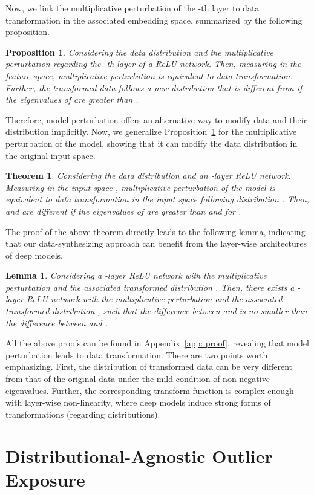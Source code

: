 \documentclass{article} \usepackage{iclr2022_conference,times}
\newtheorem{theorem}{Theorem}
\newtheorem{lemma}{Lemma}
\newtheorem{proposition}{Proposition}
\begin{document}
Now, we link the multiplicative perturbation of the -th layer to data transformation in the associated embedding space, summarized by the following proposition. 
\begin{proposition} \label{prop1}
{Considering the data distribution  and the multiplicative perturbation regarding the -th layer of a ReLU network. Then, measuring in the feature space, multiplicative perturbation is equivalent to data transformation. Further, the transformed data follows a new distribution  that is different from  if the eigenvalues of  are greater than .} 
\end{proposition}
Therefore, model perturbation offers an alternative way to modify data and their distribution implicitly. Now, we generalize Proposition~\ref{prop1} for the multiplicative perturbation of the model, showing that it can modify the data distribution in the original input space. 
\begin{theorem} \label{theo2}
{Considering the data distribution  and an -layer ReLU network. Measuring in the input space , multiplicative perturbation of the model is equivalent to data transformation in the input space following distribution . Then,  and  are different if the eigenvalues of  are greater than  and  for .} 

\end{theorem}
The proof of the above theorem directly leads to the following lemma, indicating that our data-synthesizing approach can benefit from the layer-wise architectures of deep models. 
\begin{lemma} \label{lemma3}
Considering a -layer ReLU network with the multiplicative perturbation  and the associated transformed distribution . Then, there exists a -layer ReLU network with the multiplicative perturbation  and the associated transformed distribution , such that the difference between   and  is no smaller than the difference between    and .
\end{lemma}
All the above proofs can be found in Appendix~\ref{app: proof}, revealing that model perturbation leads to data transformation. There are two points worth emphasizing. First, the distribution of transformed data can be very different from that of the original data under the mild condition of non-negative eigenvalues. Further, the corresponding transform function is complex enough with layer-wise non-linearity, where deep models induce strong forms of transformations (regarding distributions). 


\section{Distributional-Agnostic Outlier Exposure}
\label{sec: doe}
\end{document}
